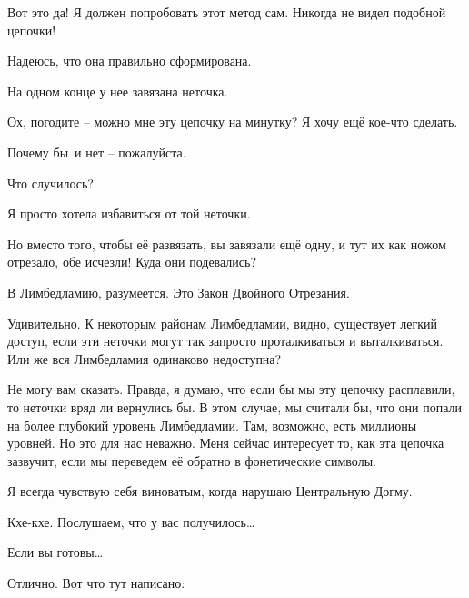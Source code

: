 \documentclass[../main.tex]{subfiles}
\begin{document}
\begin{dialogue}
 Вот это да! Я должен попробовать этот метод сам. Никогда не видел подобной цепочки!

 Надеюсь, что она правильно сформирована.

 На одном конце у нее завязана неточка.

 Ох, погодите \--- можно мне эту цепочку на минутку? Я хочу ещё кое-что сделать.

 Почему бы~и нет \--- пожалуйста.


 Что случилось?

 Я просто хотела избавиться от той неточки.

 Но вместо того, чтобы её развязать, вы завязали ещё одну, и тут их как ножом отрезало, обе исчезли! Куда они подевались?

 В Лимбедламию, разумеется. Это Закон Двойного Отрезания.


 Удивительно. К некоторым районам Лимбедламии, видно, существует легкий доступ, если эти неточки могут так запросто проталкиваться и выталкиваться. Или же вся Лимбедламия одинаково недоступна?

 Не могу вам сказать. Правда, я думаю, что если бы мы эту цепочку расплавили, то неточки вряд ли вернулись бы. В этом случае, мы считали бы, что они попали на более глубокий уровень Лимбедламии. Там, возможно, есть миллионы уровней. Но это для нас неважно. Меня сейчас интересует то, как эта цепочка зазвучит, если мы переведем её обратно в фонетические символы.

 Я всегда чувствую себя виноватым, когда нарушаю Центральную Догму.


Кхе-кхе. Послушаем, что у вас получилось\ldots{}

 Если вы готовы\ldots{}

 Отлично. Вот что тут написано:


\end{dialogue}
\end{document}
